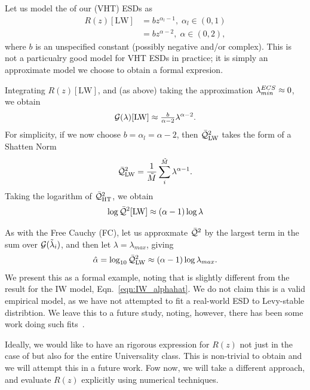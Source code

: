 Let us model the \RTransform of our \VeryHeavyTailed (VHT) ESDs as
\begin{align}
\label{eqn:LW_model_0} 
R(z)[\mathrm{LW}] & = bz^{\alpha_{l}-1},\;\alpha_{l}\in(0,1) \\ \nonumber
  & = bz^{\alpha-2},\;\alpha\in(0,2),
\end{align}
where $b$ is an unspecified constant (possibly negative and/or complex).
This is not a particualry good model for VHT ESDs in practice; it is simply an approximate model
we choose to obtain a formal expresion.

Integrating $R(z)[\mathrm{LW}]$, and (as above) taking the approximation $\lambda^{ECS}_{min}\approx 0$, we obtain 
\begin{equation}
\label{eqn:LW_model_1} 
\mathcal{G(\lambda)}[\mathrm{LW}] \approx \tfrac{b}{\alpha-2} \lambda^{\alpha-2}  .
\end{equation}
%
For simplicity, if we now choose $b=\alpha_{l}=\alpha-2$, then  $\bar{\mathcal{Q}}^{2}_{\mathrm{LW}}$ takes the form of a Shatten Norm
\begin{equation}
  \label{eqn:LW_model_2}
  \bar{\mathcal{Q}}^{2}_{\mathrm{LW}} = \frac{1}{\tilde{M}}\sum_{i}^{\tilde{M}}\lambda^{\alpha-1}  .
\end{equation}
%
Taking the logarithm of $\bar{\mathcal{Q}}^{2}_{\mathrm{HT}} $, we obtain 
\begin{equation}
\label{eqn:LW_model_3} 
\log \bar{\mathcal{Q}}^{2}[\mathrm{LW}] \approx (\alpha-1)\log\lambda
\end{equation}

As with the Free Cauchy (FC), let us approxmate $\bar{\mathcal{Q}}^{2}$ by the largest term in the sum over $\mathcal{G}(\tilde{\lambda}_{i})$, and then let $\lambda=\lambda_{max}$, giving
\begin{equation} 
\label{eqn:LW_model_4} 
\hat\alpha = \log_{10} \bar{\mathcal{Q}}^{2}_{\mathrm{LW}} \approx (\alpha-1)\log\lambda_{max}   .
\end{equation}
We present this as a formal example, noting that is slightly different from the result for the IW model, Eqn.~\ref{eqn:IW_alphahat}. 
We do not claim this is a valid empirical model, as we have not attempted to fit a real-world ESD to Levy-stable distribtion.  
We leave this to a future study, noting, however, there has been some work doing such fits~\cite{li2024exploring}.

Ideally, we would like to have an rigorous expression for $R(z)$ not just
in the case of \IdealLearning but also for the entire \FatTailed Universality class.
This is non-trivial to obtain and we will attempt this in a future work.
Fow now, we will take a different approach, and evaluate $R(z)$ explicitly using numerical techniques.

